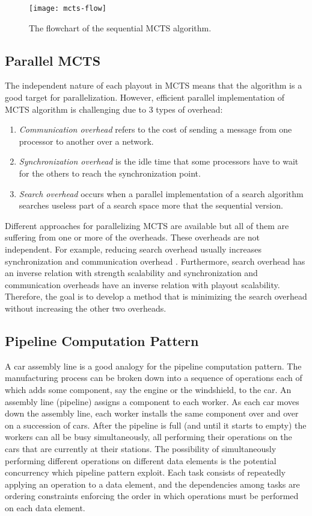 \documentclass[10pt, conference, compsocconf]{IEEEtran}
\begin{document}
\begin{figure}
\centering
\texttt{[image: mcts-flow]}
\caption{The flowchart of the sequential MCTS algorithm.}
\label{fig:mcts-flow}
\end{figure}

\subsection{Parallel MCTS}
The independent nature of each playout in MCTS means that the algorithm is a good target for parallelization. However, efficient parallel implementation of MCTS algorithm is challenging due to 3 types of overhead:
\begin{enumerate}
\item \textit{Communication overhead} refers to the cost of sending a
message from one processor to another over a network. 
\item \textit{Synchronization overhead} is the idle time that some
processors have to wait for the others to reach the
synchronization point.
\item \textit{Search overhead} occurs when a parallel implementation
of a search algorithm searches useless part of a
search space more that the sequential version.

\end{enumerate}
Different approaches for parallelizing MCTS are available but all of them are suffering from one or more of the overheads. These overheads are not independent. For example, reducing search overhead usually increases synchronization and communication overhead \cite{Soejima2010}. Furthermore, search overhead has an inverse relation with strength scalability and synchronization and communication overheads have an inverse relation with playout scalability. Therefore, the goal is to develop a method that is minimizing the search overhead without increasing the other two overheads. 
\subsection{Pipeline Computation Pattern}


A car assembly line is a good analogy for the pipeline computation pattern. The manufacturing process can be broken down into a sequence of operations each of which adds some component, say the engine or the windshield, to the car. An assembly line (pipeline) assigns a component to each worker. As each car moves down the assembly line, each worker installs the same component over and over on a succession of cars. After the pipeline is full (and until it starts to empty) the workers can all be busy simultaneously, all performing their operations on the cars that are currently at their stations.
The possibility of simultaneously performing different operations on different data elements is the potential concurrency which pipeline pattern exploit. Each task consists of repeatedly applying an operation to a data element, and the dependencies among tasks are ordering constraints enforcing the order in which operations must be performed on each data element.
\end{document}
